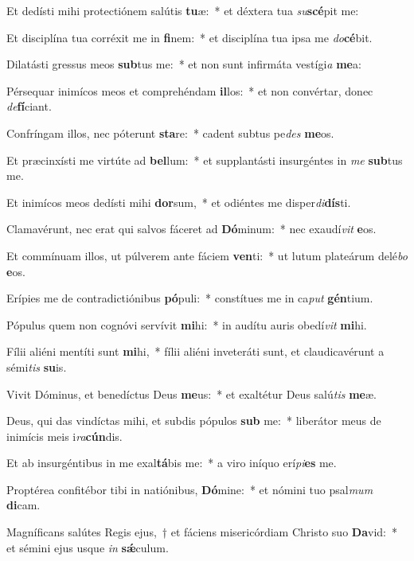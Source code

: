 \item Et dedísti mihi protectiónem salútis \textbf{tu}æ:~* et déxtera tua \textit{su}\textbf{scé}pit me:
\item Et disciplína tua corréxit me in \textbf{fi}nem:~* et disciplína tua ipsa me \textit{do}\textbf{cé}bit.
\item Dilatásti gressus meos \textbf{sub}tus me:~* et non sunt infirmáta vestígi\textit{a} \textbf{me}a:
\item Pérsequar inimícos meos et comprehéndam \textbf{il}los:~* et non convértar, donec \textit{de}\textbf{fí}ciant.
\item Confríngam illos, nec póterunt \textbf{sta}re:~* cadent subtus pe\textit{des} \textbf{me}os.
\item Et præcinxísti me virtúte ad \textbf{bel}lum:~* et supplantásti insurgéntes in \textit{me} \textbf{sub}tus me.
\item Et inimícos meos dedísti mihi \textbf{dor}sum,~* et odiéntes me disper\textit{di}\textbf{dís}ti.
\item Clamavérunt, nec erat qui salvos fáceret ad \textbf{Dó}minum:~* nec exaudí\textit{vit} \textbf{e}os.
\item Et commínuam illos, ut púlverem ante fáciem \textbf{ven}ti:~* ut lutum plateárum delé\textit{bo} \textbf{e}os.
\item Erípies me de contradictiónibus \textbf{pó}puli:~* constítues me in ca\textit{put} \textbf{gén}tium.
\item Pópulus quem non cognóvi servívit \textbf{mi}hi:~* in audítu auris obedí\textit{vit} \textbf{mi}hi.
\item Fílii aliéni mentíti sunt \textbf{mi}hi,~* fílii aliéni inveteráti sunt, et claudicavérunt a sémi\textit{tis} \textbf{su}is.
\item Vivit Dóminus, et benedíctus Deus \textbf{me}us:~* et exaltétur Deus salú\textit{tis} \textbf{me}æ.
\item Deus, qui das vindíctas mihi, et subdis pópulos \textbf{sub} me:~* liberátor meus de inimícis meis i\textit{ra}\textbf{cún}dis.
\item Et ab insurgéntibus in me exal\textbf{tá}bis me:~* a viro iníquo erí\textit{pi}\textbf{es} me.
\item Proptérea confitébor tibi in natiónibus, \textbf{Dó}mine:~* et nómini tuo psal\textit{mum} \textbf{di}cam.
\item Magníficans salútes Regis ejus,~† et fáciens misericórdiam Christo suo \textbf{Da}vid:~* et sémini ejus usque \textit{in} \textbf{sǽ}culum.
